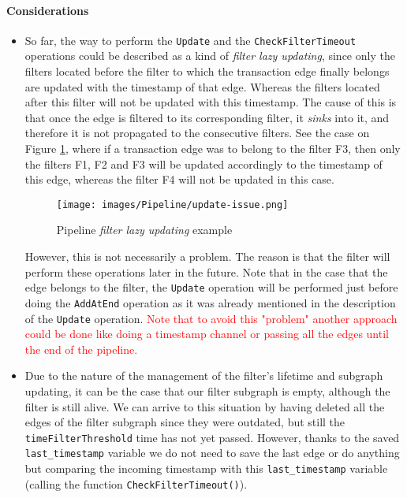 \begin{graysection}
\paragraph{Considerations}
\begin{itemize}
    \item So far, the way to perform the \texttt{Update} and the \texttt{CheckFilterTimeout} operations could be described as a kind of \textit{filter lazy updating}, since only the filters located before the filter to which the transaction edge finally belongs are updated with the timestamp of that edge. Whereas the filters located after this filter will not be updated with this timestamp. The cause of this is that once the edge is filtered to its corresponding filter, it \textit{sinks} into it, and therefore it is not propagated to the consecutive filters. See the case on Figure \ref{img:pipeline-update-issue}, where if a transaction edge was to belong to the filter F3, then only the filters F1, F2 and F3 will be updated accordingly to the timestamp of this edge, whereas the filter F4 will not be updated in this case.
    \begin{figure}[H]
        \centering
        \texttt{[image: images/Pipeline/update-issue.png]}
        \caption{Pipeline \textit{filter lazy updating} example}
        \label{img:pipeline-update-issue}
    \end{figure}
    However, this is not necessarily a problem. The reason is that the filter will perform these operations later in the future. Note that in the case that the edge belongs to the filter, the \texttt{Update} operation will be performed just before doing the \texttt{AddAtEnd} operation as it was already mentioned in the description of the \texttt{Update} operation. \textcolor{red}{Note that to avoid this "problem" another approach could be done like doing a timestamp channel or passing all the edges until the end of the pipeline.} 
    \item Due to the nature of the management of the filter's lifetime and subgraph updating, it can be the case that our filter subgraph is empty, although the filter is still alive. We can arrive to this situation by having deleted all the edges of the filter subgraph since they were outdated, but still the \texttt{timeFilterThreshold} time has not yet passed. However, thanks to the saved \texttt{last\_timestamp} variable we do not need to save the last edge or do anything but comparing the incoming timestamp with this 
    \texttt{last\_timestamp} variable (calling the function \texttt{CheckFilterTimeout()}).
\end{itemize}

\end{graysection}